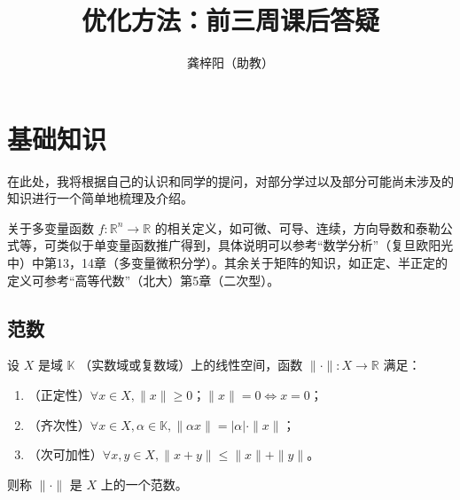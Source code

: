 \documentclass[cn]{elegantpaper}
\title{优化方法：前三周课后答疑}
\author{龚梓阳（助教）}
\date{\zhtoday}
\begin{document}
\maketitle

\section{基础知识}

在此处，我将根据自己的认识和同学的提问，对部分学过以及部分可能尚未涉及的知识进行一个简单地梳理及介绍。

关于多变量函数 $f:\mathbb{R}^{n}\rightarrow\mathbb{R}$ 的相关定义，如可微、可导、连续，方向导数和泰勒公式等，可类似于单变量函数推广得到，具体说明可以参考“数学分析”（复旦欧阳光中）中第13，14章（多变量微积分学）。其余关于矩阵的知识，如正定、半正定的定义可参考“高等代数”（北大）第5章（二次型）。

\subsection{范数}

\begin{definition}[范数]
    设 $X$ 是域 $\mathbb{K}$ （实数域或复数域）上的线性空间，函数 $\|\cdot\|:X\rightarrow\mathbb{R}$ 满足：
    \begin{enumerate}
        \item （正定性）$\forall x\in X, \|x\|\geq0$；$\|x\|=0\iff x=0$；
        \item （齐次性）$\forall x\in X, \alpha\in\mathbb{K}, \|\alpha x\|=|\alpha|\cdot\|x\|$；
        \item （次可加性）$\forall x,y\in X, \|x+y\|\leq\|x\|+\|y\|$。
    \end{enumerate}
    则称 $\|\cdot\|$ 是 $X$ 上的一个范数。
\end{definition}
\end{document}
